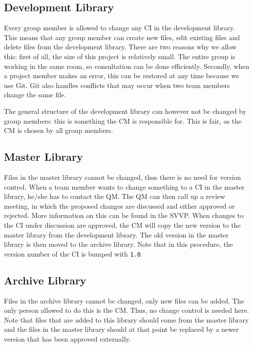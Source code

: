 \subsection{Development Library}
Every group member is allowed to change any CI in the development library. This means that any group member can create new files, edit existing files and delete files from the development library. There are two reasons why we allow this: first of all, the size of this project is relatively small. The entire group is working in the same room, so consultation can be done efficiently. Secondly, when a project member makes an error, this can be restored at any time because we use Git. Git also handles conflicts that may occur when two team members change the same file.

The general structure of the development library can however not be changed by group members: this is something the CM is responsible for. This is fair, as the CM is chosen by all group members.

\subsection{Master Library}
Files in the master library cannot be changed, thus there is no need for version control. When a team member wants to change something to a CI in the master library, he/she has to contact the QM. The QM can then call up a review meeting, in which the proposed changes are discussed and either approved or rejected. More information on this can be found in the SVVP. When changes to the CI under discussion are approved, the CM will copy the new version to the master library from the development library. The old version in the master library is then moved to the archive library. Note that in this procedure, the version number of the CI is bumped with \texttt{1.0}.

\subsection{Archive Library}
Files in the archive library cannot be changed, only new files can be added. The only person allowed to do this is the CM. Thus, no change control is needed here. Note that files that are added to this library should come from the master library and the files in the master library should at that point be replaced by a newer version that has been approved externally.